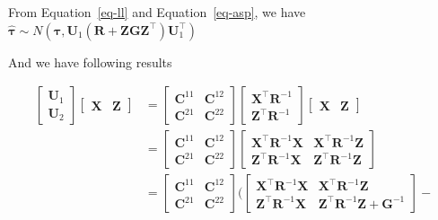 \documentclass[
  a4paper,
  oneside,
  openany,
  12pt,
  onecolumn]{book}
\theoremstyle{definition}
\theoremstyle{plain}
\theoremstyle{remark}
\begin{document}
From Equation~\ref{eq-ll} and Equation~\ref{eq-asp}, we have
\(\hat{\boldsymbol{\tau}}\sim N(\boldsymbol{\tau},\boldsymbol{U}_1(\boldsymbol{R}+\boldsymbol{ZGZ}^\top)\boldsymbol{U}_1^\top)\)

And we have following results

\[\begin{aligned}
\begin{bmatrix}
\boldsymbol{U}_1 \\
\boldsymbol{U}_2
\end{bmatrix}
\begin{bmatrix}
\boldsymbol{X} & \boldsymbol{Z}
\end{bmatrix}
&=
\begin{bmatrix}
\boldsymbol{C}^{11} & \boldsymbol{C}^{12} \\
\boldsymbol{C}^{21} & \boldsymbol{C}^{22}
\end{bmatrix}
\begin{bmatrix}
\boldsymbol{X}^\top\boldsymbol{R}^{-1}\\
\boldsymbol{Z}^\top\boldsymbol{R}^{-1}
\end{bmatrix}
\begin{bmatrix}
\boldsymbol{X} & \boldsymbol{Z}
\end{bmatrix}\\
&=
\begin{bmatrix}
\boldsymbol{C}^{11} & \boldsymbol{C}^{12} \\
\boldsymbol{C}^{21} & \boldsymbol{C}^{22}
\end{bmatrix}
\begin{bmatrix}
\boldsymbol{X}^\top\boldsymbol{R}^{-1}\boldsymbol{X} & \boldsymbol{X}^\top\boldsymbol{R}^{-1}\boldsymbol{Z}\\
\boldsymbol{Z}^\top\boldsymbol{R}^{-1}\boldsymbol{X} & \boldsymbol{Z}^\top\boldsymbol{R}^{-1}\boldsymbol{Z}
\end{bmatrix}\\
&=
\begin{bmatrix}
\boldsymbol{C}^{11} & \boldsymbol{C}^{12} \\
\boldsymbol{C}^{21} & \boldsymbol{C}^{22}
\end{bmatrix}
(
\begin{bmatrix}
\boldsymbol{X}^\top\boldsymbol{R}^{-1}\boldsymbol{X} & \boldsymbol{X}^\top\boldsymbol{R}^{-1}\boldsymbol{Z}\\
\boldsymbol{Z}^\top\boldsymbol{R}^{-1}\boldsymbol{X} & \boldsymbol{Z}^\top\boldsymbol{R}^{-1}\boldsymbol{Z}+\boldsymbol{G}^{-1}
\end{bmatrix}-

\end{aligned}\]
\end{document}
